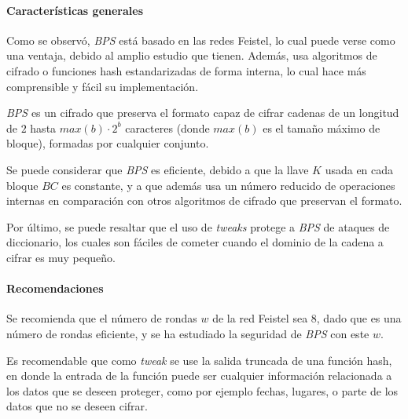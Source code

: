 \paragraph{Características generales}

Como se observó, \textit{BPS} está basado en las redes Feistel, lo cual puede
verse como una ventaja, debido al amplio estudio que tienen. Además, usa
algoritmos de cifrado o funciones hash estandarizadas de forma interna, lo
cual hace más comprensible y fácil su implementación.

\textit{BPS} es un cifrado que preserva el formato capaz de cifrar cadenas de
un longitud de $2$ hasta $max(b) \cdot 2^{b}$ caracteres (donde $max(b)$ es el
tamaño máximo de bloque), formadas por cualquier conjunto.

Se puede considerar que \textit{BPS} es eficiente, debido a que la llave $K$
usada en cada bloque $BC$ es constante, y a que además usa un número reducido
de operaciones internas en comparación con otros algoritmos de cifrado que
preservan el formato.

Por último, se puede resaltar que el uso de \textit{tweaks} protege a
\textit{BPS} de ataques de diccionario, los cuales son fáciles de cometer cuando
el dominio de la cadena a cifrar es muy pequeño.


\paragraph{Recomendaciones}

Se recomienda que el número de rondas $w$ de la red Feistel sea $8$, dado
que es una número de rondas eficiente, y se ha estudiado la seguridad de
\textit{BPS} con este $w$.

Es recomendable que como \textit{tweak} se use la salida truncada de una función
hash, en donde la entrada de la función puede ser cualquier información
relacionada a los datos que se deseen proteger, como por ejemplo fechas, lugares,
o parte de los datos que no se deseen cifrar.
